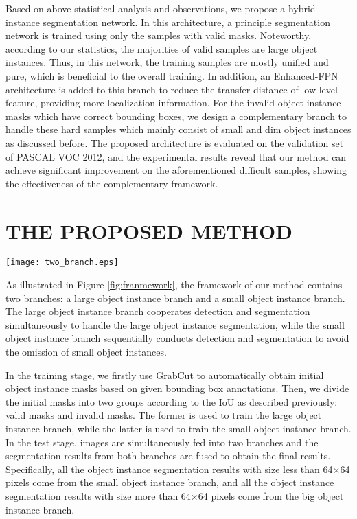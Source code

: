 \documentclass{article}
\begin{document}
Based on above statistical analysis and observations, we propose a hybrid instance segmentation network.
In this architecture, a principle segmentation network is trained using only the samples with valid masks.
Noteworthy, according to our statistics, the majorities of valid samples are large object instances.
Thus, in this network, the training samples are mostly unified and pure, which is beneficial to the overall training.
In addition, an Enhanced-FPN architecture is added to this branch to reduce the transfer distance of low-level feature, providing more localization information.
For the invalid object instance masks which have correct bounding boxes, we design a complementary branch to handle these hard samples which mainly consist of small and dim object instances as discussed before.
The proposed architecture is evaluated on the validation set of PASCAL VOC 2012, and the experimental results reveal that our method can achieve significant improvement on the aforementioned difficult samples, showing the effectiveness of the complementary framework.

\section{THE PROPOSED METHOD}
\label{sec:method}
\begin{figure*}[t]
\centering
\texttt{[image: two\_branch.eps]}
\caption{Illustration of our framework.}
\label{fig:franmework}
\end{figure*}

As illustrated in Figure \ref{fig:franmework}, the framework of our method contains two branches: a large object instance branch and a small object instance branch.
The large object instance branch cooperates detection and segmentation simultaneously to handle the large object instance segmentation, while the small object instance branch sequentially conducts detection and segmentation to avoid the omission of small object instances.

In the training stage, we firstly use GrabCut \cite{GrabCut} to automatically obtain initial object instance masks based on given bounding box annotations.
Then, we divide the initial masks into two groups according to the IoU as described previously: valid masks and invalid masks.
The former is used to train the large object instance branch, while the latter is used to train the small object instance branch.
In the test stage, images are simultaneously fed into two branches and the segmentation results from both branches are fused to obtain the final results.
Specifically, all the object instance segmentation results with size less than 64$\times$64 pixels come from the small object instance branch, and all the object instance segmentation results with size more than 64$\times$64 pixels come from the big object instance branch.
\end{document}
